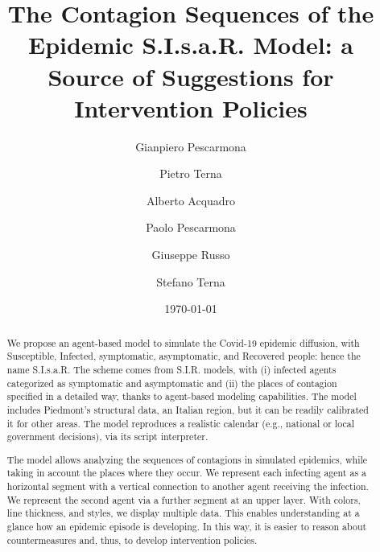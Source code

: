 \documentclass[11pt]{article}
\begin{document}
\title{The Contagion Sequences of the Epidemic S.I.s.a.R. Model: a Source of Suggestions for Intervention Policies}
\author[1]{Gianpiero Pescarmona}
\author[2]{Pietro Terna}
\author[1]{Alberto Acquadro}
\author[3]{Paolo Pescarmona}
\author[4]{Giuseppe Russo}
\author[5]{Stefano Terna}

\renewcommand\Affilfont{\itshape\small}


\date{\today}                                           %

\maketitle

\begin{abstract}
 
We propose an agent-based model to simulate the Covid-19 epidemic diffusion, with Susceptible, Infected, symptomatic, asymptomatic, and Recovered people: hence the name S.I.s.a.R. The scheme comes from S.I.R. models, with (i) infected agents categorized as symptomatic and asymptomatic and (ii) the places of contagion specified in a detailed way, thanks to agent-based modeling capabilities. The model includes Piedmont's structural data, an Italian region, but it can be readily calibrated it for other areas. The model reproduces a realistic calendar (e.g., national or local government decisions), via its script interpreter. 

The model allows analyzing the sequences of contagions in simulated epidemics, while taking in account the places where they occur. We represent each infecting agent as a horizontal segment with a vertical connection to another agent receiving the infection. We represent the second agent via a further segment at an upper layer. With colors, line thickness, and styles, we display multiple data. This enables understanding at a glance how an epidemic episode is developing. In this way, it is easier to reason about countermeasures and, thus, to develop intervention policies.

 
\end{abstract}
\end{document}
